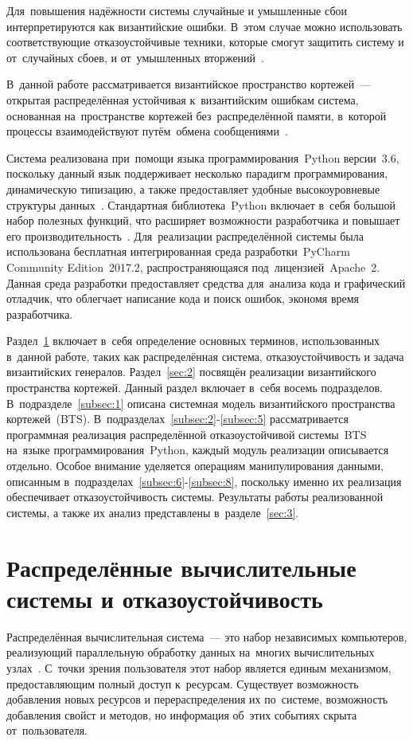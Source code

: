 Для~повышения надёжности системы случайные и умышленные сбои интерпретируются как византийские ошибки. В~этом случае можно использовать соответствующие отказоустойчивые техники, которые смогут защитить систему и от~случайных сбоев, и от~умышленных вторжений~\autocite{bts, paxos, Lamport}.

В~данной работе рассматривается византийское пространство кортежей~--- открытая распределённая устойчивая к~византийским ошибкам система, основанная на~пространстве кортежей без~распределённой памяти, в~которой процессы взаимодействуют путём~обмена сообщениями~\autocite{bts, tuplespace}.

Система реализована при~помощи языка программирования~Python версии~3.6, поскольку данный язык поддерживает несколько парадигм программирования, динамическую типизацию, а также предоставляет удобные высокоуровневые структуры данных~\autocite{Gorelick}. Стандартная библиотека~Python включает в~себя большой набор полезных функций, что расширяет возможности разработчика и повышает его производительность~\autocite{docs}. Для~реализации распределённой системы была использована бесплатная интегрированная среда разработки~PyCharm Community Edition~2017.2, распространяющаяся под~лицензией~Apache~2. Данная среда разработки предоставляет средства для~анализа кода и графический отладчик, что облегчает написание кода и поиск ошибок, экономя время разработчика.

Раздел~\ref{sec:1} включает в~себя определение основных терминов, использованных в~данной работе, таких как распределённая система, отказоустойчивость и задача византийских генералов. Раздел~\ref{sec:2} посвящён реализации византийского пространства кортежей. Данный раздел включает в~себя восемь подразделов. В~подразделе~\ref{subsec:1} описана системная модель византийского пространства кортежей~(BTS). В~подразделах~\ref{subsec:2}-\ref{subsec:5} рассматривается программная реализация распределённой отказоустойчивой системы~BTS на~языке программирования~Python, каждый модуль реализации описывается отдельно. Особое внимание уделяется операциям манипулирования данными, описанным в~подразделах~\ref{subsec:6}-\ref{subsec:8}, поскольку именно их реализация обеспечивает отказоустойчивость системы. Результаты работы реализованной системы, а также их анализ представлены в~разделе~\ref{sec:3}.



\section{Распределённые вычислительные системы и отказоустойчивость}\label{sec:1}
Распределённая вычислительная система~--- это набор независимых компьютеров, реализующий параллельную обработку данных на~многих вычислительных узлах~\autocite{Tanenbaum}. С~точки зрения пользователя этот набор является единым механизмом, предоставляющим полный доступ к~ресурсам. Существует возможность добавления новых ресурсов и перераспределения их по~системе, возможность добавления свойст и методов, но информация об~этих событиях скрыта от~пользователя.

